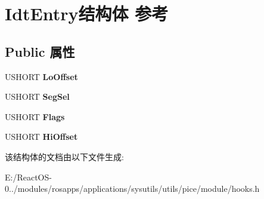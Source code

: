 \hypertarget{struct_idt_entry}{}\section{Idt\+Entry结构体 参考}
\label{struct_idt_entry}
\subsection*{Public 属性}
\begin{DoxyCompactItemize}
\item 
\mbox{\label{struct_idt_entry_aa20bea0110fcd9cce34f4a75f6c441f2}} 
U\+S\+H\+O\+RT {\bfseries Lo\+Offset}
\item 
\mbox{\label{struct_idt_entry_a56a73a704e34d6788befd0f61c64958e}} 
U\+S\+H\+O\+RT {\bfseries Seg\+Sel}
\item 
\mbox{\label{struct_idt_entry_a4953f2c398ae8cd74cbb11040bea715a}} 
U\+S\+H\+O\+RT {\bfseries Flags}
\item 
\mbox{\label{struct_idt_entry_a89c10b192b9863e0b1efe95754e16de0}} 
U\+S\+H\+O\+RT {\bfseries Hi\+Offset}
\end{DoxyCompactItemize}


该结构体的文档由以下文件生成\+:\begin{DoxyCompactItemize}
\item 
E\+:/\+React\+O\+S-\/0../modules/rosapps/applications/sysutils/utils/pice/module/hooks.\+h\end{DoxyCompactItemize}

